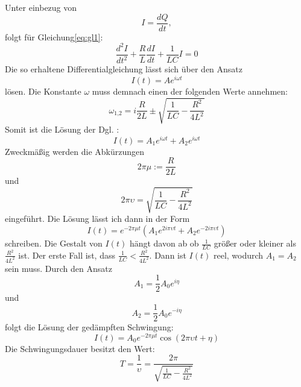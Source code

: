Unter einbezug von
\begin{equation}
  I = \frac{dQ}{dt} ,
\end{equation}
folgt für Gleichung\eqref{eq:gl1}:
\begin{equation}
  \label{eq:gl2}
  \frac{d^2I}{dt^2}+\frac{R}{L}\frac{dI}{dt}+\frac{1}{LC}I =0
\end{equation}
 Die so erhaltene Differentialgleichung lässt sich über den Ansatz
 \begin{equation}
   \label{eq:gl3}
   I(t) = A e^{i\omega t}
 \end{equation}
lösen.
Die Konstante $\omega$ muss demnach einen der folgenden Werte annehmen:
\begin{equation}
  \omega_\text{1,2} = i \frac{R}{2L} \pm \sqrt{\frac{1}{LC} - \frac{R^2}{4L^2}}
\end{equation}
Somit ist die Lösung der Dgl. :
\begin{equation}
  I(t) = A_1 e^{i \omega t} + A_2 e^{i \omega t}
\end{equation}
Zweckmäßig werden die Abkürzungen
\begin{equation*}
  2\pi \mu := \frac{R}{2L}
\end{equation*}
und
\begin{equation*}
  2 \pi \upsilon = \sqrt{\frac{1}{LC}-\frac{R^2}{4L^2}}
\end{equation*}
eingeführt.
Die Lösung lässt ich dann in der Form
\begin{equation}
\label{eq:steig}
  I(t)= e^{-  2\pi \mu t} (A_1 e^{2 i \pi \upsilon t} + A_2 e^{-2 i \pi \upsilon t})
\end{equation}
schreiben.
Die Gestalt von $I(t)$ hängt davon ab ob $\frac{1}{LC}$ größer oder kleiner als $\frac{R^2}{4L^2}$ ist.
Der erste Fall ist, dass $\frac{1}{LC}<\frac{R^2}{4L^2}$.
Dann ist $I(t)$ reel, wodurch $A_1=A_2$ sein muss.
Durch den Ansatz
\begin{equation}
  A_1 = \frac{1}{2}A_0 e^{i \eta}
\end{equation}
und
\begin{equation}
A_2 = \frac{1}{2}A_0 e^{-i \eta}
\end{equation}
folgt die Lösung der gedämpften Schwingung:
\begin{equation}
  I(t) = A_0 e^{- 2 \pi \mu t} \cos(2 \pi \upsilon t + \eta)
\end{equation}
Die Schwingungsdauer besitzt den Wert:
\begin{equation}
  T = \frac{1}{\upsilon}=\frac{2 \pi}{\sqrt{\frac{1}{LC}-\frac{R^2}{4L^2}}}
\end{equation}
